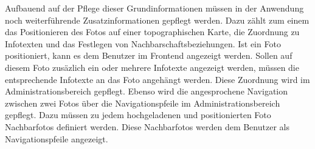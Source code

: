 Aufbauend auf der Pflege dieser Grundinformationen müssen in der Anwendung noch
weiterführende Zusatzinformationen gepflegt werden. Dazu zählt zum einem das
Positionieren des Fotos auf einer topographischen Karte, die Zuordnung zu
Infotexten und das Festlegen von Nachbarschaftsbeziehungen. Ist ein Foto
positioniert, kann es dem Benutzer im Frontend angezeigt werden. 
Sollen auf diesem Foto zusäzlich ein oder mehrere Infotexte angezeigt werden,
müssen die entsprechende Infotexte an das Foto angehängt werden. Diese Zuordnung
wird im Administrationsbereich gepflegt. Ebenso wird die angesprochene
Navigation zwischen zwei Fotos über die Navigationspfeile im
Administrationsbereich gepflegt. Dazu müssen zu jedem hochgeladenen und
positionierten Foto Nachbarfotos definiert werden. Diese Nachbarfotos werden dem
Benutzer als Navigationspfeile angezeigt.
